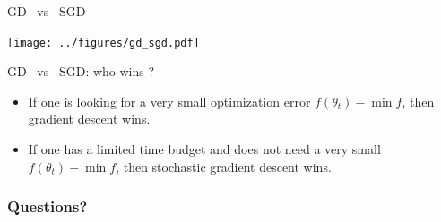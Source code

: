 \documentclass{beamer}
\begin{document}
\begin{frame}[t]{GD \ vs \ SGD}
	\grid

	\hspace*{-0.7cm}
	\texttt{[image: ../figures/gd\_sgd.pdf]}

\end{frame}

\begin{frame}[t]{GD \ vs \ SGD: who wins ?}
	\grid

	\begin{itemize}
		\item If one is looking for a very small optimization error $f(\theta_t) - \min f$, then gradient descent wins.
			\vspace{2mm}
		\item If one has a limited time budget and does not need a very small $f(\theta_t) - \min f$, then stochastic gradient descent wins.
	\end{itemize}

\end{frame}

\appendix
\backupbegin

\begin{frame}[t]
	\frametitle{Questions?}
	\grid

	\pause
\end{frame}

\backupend
\end{document}
